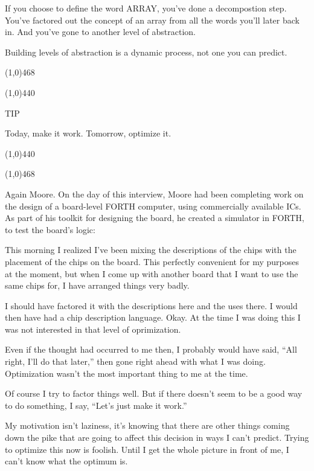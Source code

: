\documentclass{book}
\begin{document}
\begin{list}{}{}
\item
If you choose to define the word ARRAY, you've done a decompostion step. You've factored out the concept of an array from all the words you'll later back in. And you've gone to another level of abstraction.

\item
Building levels of abstraction is a dynamic process, not one you can predict.

\end{list}{}{}

\noindent
\line(1,0){468}

\line(1,0){440} 

TIP 

Today, make it work. Tomorrow, optimize it.

\line(1,0){440}

\noindent
\line(1,0){468} 

\noindent
Again Moore. On the day of this interview, Moore had been completing work on the design of a board-level FORTH computer, using commercially available ICs. As part of his toolkit for designing the board, he created a simulator in FORTH, to test the board's logic:

\bigskip

\begin{list}{}{}

\item
This morning I realized I've been mixing the descriptions of the chips with the placement of the chips on the board. This perfectly convenient for my purposes at the moment, but when I come up with another board that I want to use the same chips for, I have arranged things very badly.

\item
I should have factored it with the descriptions here and the uses there. I would then have had a chip description language. Okay. At the time I was doing this I was not interested in that level of oprimization.

\item 
Even if the thought had occurred to me then, I probably would have said, ``All right, I'll do that later,'' then gone right ahead with what I was doing. Optimization wasn't the most important thing to me at the time.

\item 
Of course I try to factor things well. But if there doesn't seem to be a good way to do something, I say, ``Let's just make it work.''

\item 
My motivation isn't laziness, it's knowing that there are other things coming down the pike that are going to affect this decision in ways I can't predict. Trying to optimize this now is foolish. Until I get the whole picture in front of me, I can't know what the optimum is.

\end{list}{}{}
\end{document}
